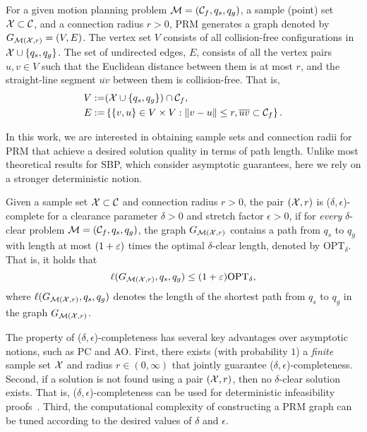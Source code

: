 For a given motion planning problem $\mathcal{M} = (\mathcal{C}_f,q_s,q_g)$, a sample (point) set $\mathcal{X}\subset \mathcal{C}$, and a connection radius $r>0$, PRM generates a graph denoted by $G_{\mathcal{M}(\mathcal{X}, r)} = (V,E)$. The vertex set $V$ consists of all collision-free configurations in $\mathcal{X} \cup \{ q_s, q_g\}$. The set of undirected edges, $E$, consists of all the vertex pairs $u, v\in V$ such that the Euclidean distance between them is at most $r$, and the straight-line segment $\overline{uv}$ between them is collision-free. That is, 
\begin{align*}
V := & (\mathcal{X}\cup \{ q_s, q_g\}) \cap \mathcal{C}_f, \\
E := & \left\{ \{v, u\} \in V\times V : \lVert v-u\rVert\leq r, \overline{uv} \subset \mathcal{C}_f \right\}.
\end{align*}

In this work, we are interested in obtaining sample sets and connection radii for PRM that achieve a desired solution quality in terms of path length. Unlike most theoretical results for SBP, which consider asymptotic guarantees, here we rely on a stronger deterministic notion.

\begin{definition} Given a sample set $\mathcal{X}\subset \mathcal{C}$ and connection radius $r>0$, the pair $(\mathcal{X}, r)$ is ($\delta,\epsilon$)-complete for a clearance parameter $\delta>0$ and stretch factor $\epsilon>0$, if for \emph{every} $\delta$-clear problem $\mathcal{M}=(\mathcal{C}_f, q_s, q_g)$, the  graph $G_{\mathcal{M}(\mathcal{X}, r)}$ contains a path from $q_s$ to $q_g$ with length at most $(1+\varepsilon)$ times the optimal $\delta$-clear length, denoted by $\text{OPT}_\delta$. That is, it holds that
\[
    \ell(G_{\mathcal{M}(\mathcal{X}, r)},q_s, q_g)\leq (1+\varepsilon)\text{OPT}_\delta,
\]
where $\ell(G_{\mathcal{M}(\mathcal{X}, r)},q_s, q_g)$ denotes the length of the shortest path from $q_s$ to $q_g$ in the graph $G_{\mathcal{M}(\mathcal{X}, r)}$.
\end{definition}

The property of ($\delta,\epsilon$)-completeness has several key advantages over asymptotic notions, such as PC and AO. First, there exists (with probability $1$) a \emph{finite} sample set $\mathcal{X}$ and radius $r\in (0,\infty)$  that jointly guarantee ($\delta,\epsilon$)-completeness. Second, if a solution is not found using a \decomp pair $(\mathcal{X},r)$, then no $\delta$-clear solution exists. That is, ($\delta,\epsilon$)-completeness can be used for deterministic infeasibility proofs~\cite{li2023sampling}. Third, the computational complexity of constructing a PRM graph can be tuned according to the desired values of $\delta$ and $\epsilon$. %



